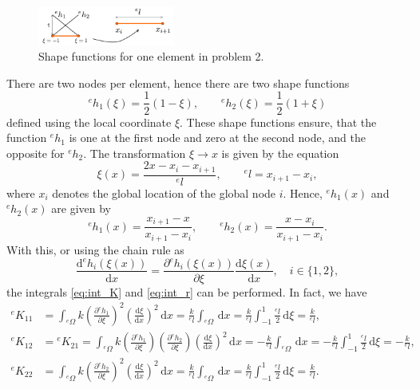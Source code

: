 \documentclass[a4paper,11pt]{article}
\numberwithin{equation}{section}
\begin{document}
{\begin{figure}[h]
	\centering
	\includegraphics[width=0.4\textwidth]{figures/prob2_elem.png}
	\caption{Shape functions for one element in problem 2.}
	\label{fig:prob2_elem}
\end{figure} There are two nodes per element, hence there are two shape functions \begin{equation}
	^e h_1(\xi) = \frac{1}{2}(1-\xi), \qquad ^e h_2(\xi) = \frac{1}{2}(1 + \xi)
\end{equation} defined using the local coordinate $\xi$. These shape functions ensure, that the function $^eh_1$ is one at the first node and zero at the second node, and the opposite for $^e h_2$. The transformation $\xi \rightarrow x $ is given by the equation \begin{equation}
	\xi(x) = \frac{2x - x_i - x_{i+1}}{^e l}, \qquad {}^e l = x_{i+1} - x_i,
\end{equation} where $x_i$ denotes the global location of the global node $i$. Hence, $^e h_1(x)$ and $^e h_2(x)$ are given by \begin{equation}
	^e h_1(x) = \frac{x_{i+1}-x}{x_{i+1}-x_i}, \qquad {}^e h_2(x) = \frac{x-x_i}{x_{i+1}-x_i}.
\end{equation} With this, or using the chain rule as \begin{equation}
	\frac{\mathrm{d}{}^e h_i(\xi(x))}{\mathrm{d}x} = \frac{\partial {}^e h_i(\xi(x))}{\partial \xi}\frac{\mathrm{d} \xi(x)}{\mathrm{d}x}, \quad i \in \{1,2\},
\end{equation} the integrals \cref{eq:int_K} and \cref{eq:int_r} can be performed. In fact, we have \begin{align}
	^e K_{11} &= \int_{{}^e\Omega} k  \left(\frac{\partial {}^e h_1}{\partial \xi}\right)^2\left(\frac{\mathrm{d} \xi}{\mathrm{d}x}\right)^2\,\mathrm{d}x = \frac{k}{^e l} \int_{{}^e\Omega}\,\mathrm{d}x = \frac{k}{^el}\int_{-1}^{1} \frac{^e l}{2}\,\mathrm{d}\xi = \frac{k}{^e l}, \\
	^e K_{12}&= {}^e K_{21} = \int_{{}^e\Omega} k  \left(\frac{\partial {}^e h_1}{\partial \xi}\right)\left(\frac{\partial {}^e h_2}{\partial \xi}\right)\left(\frac{\mathrm{d} \xi}{\mathrm{d}x}\right)^2\,\mathrm{d}x = -\frac{k}{^e l} \int_{{}^e\Omega}\,\mathrm{d}x = -\frac{k}{^el}\int_{-1}^{1} \frac{^e l}{2}\,\mathrm{d}\xi = -\frac{k}{^e l}, \\
	^e K_{22} &= \int_{{}^e\Omega} k  \left(\frac{\partial {}^e h_2}{\partial \xi}\right)^2\left(\frac{\mathrm{d} \xi}{\mathrm{d}x}\right)^2\,\mathrm{d}x = \frac{k}{^e l} \int_{{}^e\Omega}\,\mathrm{d}x = \frac{k}{^el}\int_{-1}^{1} \frac{^e l}{2}\,\mathrm{d}\xi = \frac{k}{^e l}.

\end{align}}
\end{document}
